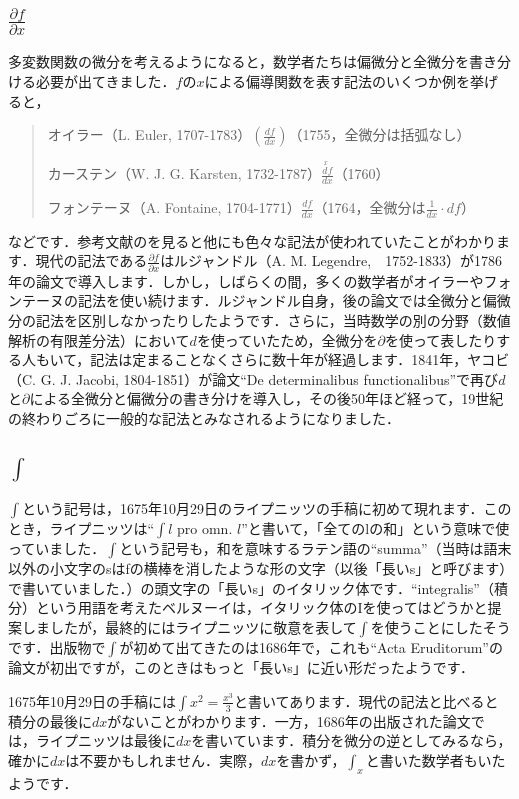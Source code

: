 \documentclass[./main]{subfile}
\begin{document}
\subsection{$\frac{\partial f}{\partial x}$}
多変数関数の微分を考えるようになると，数学者たちは偏微分と全微分を書き分ける必要が出てきました．$f$の$x$による偏導関数を表す記法のいくつか例を挙げると，
\begin{quote}
オイラー（L. Euler, 1707-1783）\quad $\left(\frac{df}{dx}\right)$（1755，全微分は括弧なし）

カーステン（W. J. G. Karsten, 1732-1787）\quad $\frac{\overset{\ x}{d}\! f}{dx}$（1760）

フォンテーヌ（A. Fontaine, 1704-1771）\quad $\frac{df}{dx}$（1764，全微分は$\frac{1}{dx}\cdot df$）
\end{quote}
などです．参考文献の\cite{Cajori1923}を見ると他にも色々な記法が使われていたことがわかります．現代の記法である$\frac{\partial f}{\partial x}$はルジャンドル（A. M. Legendre,　1752-1833）が1786年の論文で導入します．しかし，しばらくの間，多くの数学者がオイラーやフォンテーヌの記法を使い続けます．ルジャンドル自身，後の論文では全微分と偏微分の記法を区別しなかったりしたようです．さらに，当時数学の別の分野（数値解析の有限差分法）において$d$を使っていたため，全微分を$\partial$を使って表したりする人もいて，記法は定まることなくさらに数十年が経過します．1841年，ヤコビ（C. G. J. Jacobi, 1804-1851）が論文``De determinalibus functionalibus''で再び$d$と$\partial$による全微分と偏微分の書き分けを導入し，その後50年ほど経って，19世紀の終わりごろに一般的な記法とみなされるようになりました．

\subsection{$\int$}
$\int$という記号は，1675年10月29日のライプニッツの手稿に初めて現れます．このとき，ライプニッツは``$\int l$ pro omn. $l$''と書いて，「全てのlの和」という意味で使っていました．$\int$という記号も，和を意味するラテン語の``summa''（当時は語末以外の小文字のsはfの横棒を消したような形の文字（以後「長いs」と呼びます）で書いていました．）の頭文字の「長いs」のイタリック体です．``integralis''（積分）という用語を考えたベルヌーイは，イタリック体のIを使ってはどうかと提案しましたが，最終的にはライプニッツに敬意を表して$\int$を使うことにしたそうです．出版物で$\int$が初めて出てきたのは1686年で，これも``Acta Eruditorum''の論文が初出ですが，このときはもっと「長いs」に近い形だったようです．

1675年10月29日の手稿には$\int x^2=\frac{x^3}{3}$と書いてあります．現代の記法と比べると積分の最後に$dx$がないことがわかります．一方，1686年の出版された論文では，ライプニッツは最後に$dx$を書いています．積分を微分の逆としてみるなら，確かに$dx$は不要かもしれません．実際，$dx$を書かず，$\int_x$と書いた数学者もいたようです．
\end{document}
